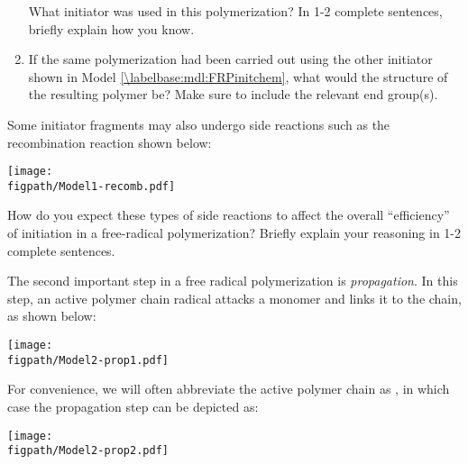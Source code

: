 \begin{activity}
\begin{ctqs}
\begin{enumerate}
			What initiator was used in this polymerization?  In 1-2 complete sentences, briefly explain how you know.
	
				\begin{solution}[2in]
				\end{solution}
			
			\item If the same polymerization had been carried out using the other initiator shown in Model \ref{\labelbase:mdl:FRPinitchem}, what would the structure of the resulting polymer be?  Make sure to include the relevant end group(s).
	
				\begin{solution}[2in]
				\end{solution}
				
		\end{enumerate}
		
	\question Some initiator fragments may also undergo side reactions such as the recombination reaction shown below:
	
			\centerline{\texttt{[image: \\figpath/Model1-recomb.pdf]}}
			
				How do you expect these types of side reactions to affect the overall ``efficiency'' of initiation in a free-radical polymerization? Briefly explain your reasoning in 1-2 complete sentences.
	
				\begin{solution}[1.5in]
				\end{solution}

\end{ctqs}



\begin{model}[Propagation]
\label{\labelbase:mdl:FRPpropchem}

	The second important step in a free radical polymerization is \emph{propagation}.  In this step, an active polymer chain radical attacks a monomer and links it to the chain, as shown below:
	
			\centerline{\texttt{[image: \\figpath/Model2-prop1.pdf]}}
	
	For convenience, we will often abbreviate the active polymer chain as , in which case the propagation step can be depicted as:
	
			\centerline{\texttt{[image: \\figpath/Model2-prop2.pdf]}}
	

\end{model}

\begin{ctqs}


\end{ctqs}
\end{activity}
